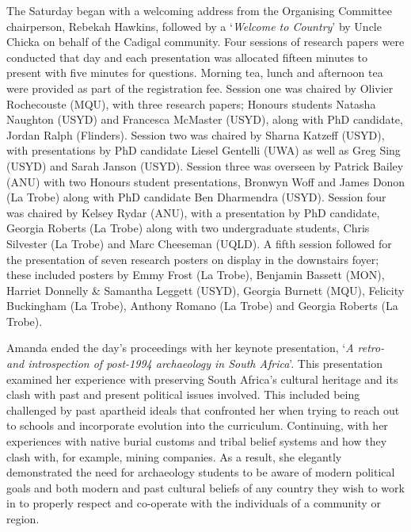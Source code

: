 The Saturday began with a welcoming address from the Organising Committee chairperson, Rebekah Hawkins, followed by a ‘\textit{Welcome to Country}’ by Uncle Chicka on behalf of the Cadigal community. Four sessions of research papers were conducted that day and each presentation was allocated fifteen minutes to present with five minutes for questions. Morning tea, lunch and afternoon tea were provided as part of the registration fee. Session one was chaired by Olivier Rochecouste (MQU), with three research papers; Honours students Natasha Naughton (USYD) and Francesca McMaster (USYD), along with PhD candidate, Jordan Ralph (Flinders). Session two was chaired by Sharna Katzeff (USYD), with presentations by PhD candidate Liesel Gentelli (UWA) as well as Greg Sing (USYD) and Sarah Janson (USYD). Session three was overseen by Patrick Bailey (ANU) with two Honours student presentations, Bronwyn Woff and James Donon (La Trobe) along with PhD candidate Ben Dharmendra (USYD). Session four was chaired by Kelsey Rydar (ANU), with a presentation by PhD candidate, Georgia Roberts (La Trobe) along with two undergraduate students, Chris Silvester (La Trobe) and Marc Cheeseman (UQLD). A fifth session followed for the presentation of seven research posters on display in the downstairs foyer; these included posters by Emmy Frost (La Trobe), Benjamin Bassett (MON), Harriet Donnelly \& Samantha Leggett (USYD), Georgia Burnett (MQU), Felicity Buckingham (La Trobe), Anthony Romano (La Trobe) and Georgia Roberts (La Trobe). 

Amanda ended the day’s proceedings with her keynote presentation, ‘\textit{A retro- and introspection of post-1994 archaeology in South Africa}’. This presentation examined her experience with preserving South Africa’s cultural heritage and its clash with past and present political issues involved. This included being challenged by past apartheid ideals that confronted her when trying to reach out to schools and incorporate evolution into the curriculum. Continuing, with her experiences with native burial customs and tribal belief systems and how they clash with, for example, mining companies. As a result, she elegantly demonstrated the need for archaeology students to be aware of modern political goals and both modern and past cultural beliefs of any country they wish to work in to properly respect and co-operate with the individuals of a community or region. 


